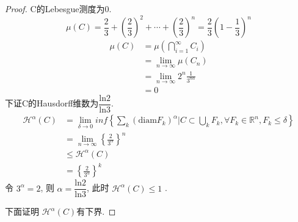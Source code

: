 \documentclass[hyperref,a4paper,UTF8]{ctexart}
\begin{document}
\begin{proof}
C的Lebesgue测度为0. 
\[
\mu(C) = \frac{2}{3}+\left(\frac{2}{3}\right)^2+\cdots+\left(\frac{2}{3}\right)^n=\frac{2}{3}\left(1-\frac{1}{3}\right)^n
\]
\[
\begin{aligned}
  \mu(C) &= \mu\left(\bigcap_{i=1}^{\infty} C_i\right) \\
  &= \lim\limits_{n \rightarrow \infty} \mu(C_n) \\
  &=  \lim\limits_{n \rightarrow \infty}2^{n}\frac{1}{3^{n\alpha}}\\
  &= 0
\end{aligned}
\]
下证C的Hausdorff维数为$\dfrac{\mathrm{ln}2}{\mathrm{ln}3}$.
\[
\begin{aligned}
  \mathcal{H}^\alpha(C) &= \lim\limits_{\delta \rightarrow 0}inf\left \{ \sum_{k}(\mathrm{diam}F_k)^{\alpha} \vert C \subset \bigcup\limits_{k} F_k , \forall F_k\in \mathbb{R}^n, F_k \le \delta \right \} \\
  &= \lim\limits_{n \rightarrow \infty}\left \{\frac{2}{3^\alpha} \right \}^{n} \\
  &\leqslant \mathcal{H}^\alpha(C)\\
  &= \left \{\frac{2}{3^\alpha} \right \}^{k}
\end{aligned}  
\]
令 $3^\alpha = 2$, 则
$\alpha = \dfrac{\mathrm{ln}2}{\mathrm{ln}3}$, 此时 $\mathcal{H}^\alpha(C) \leqslant 1 $ . 

下面证明 $\mathcal{H}^\alpha(C)$有下界.


\end{proof}
\end{document}
